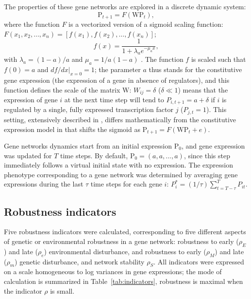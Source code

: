 \documentclass[10pt,a4paper]{article}
\newcommand{\stability}{{\rho_S}}
\newcommand{\earlyenv}{{\rho_E}}
\newcommand{\lateenv}{{\rho_e}}
\newcommand{\earlymut}{{\rho_M}}
\newcommand{\latemut}{{\rho_m}}
\newcommand{\W}{\bm{\mathrm W}}
\newcommand{\Pp}{\bm{\mathrm P}}
\begin{document}
The properties of these gene networks are explored in a discrete dynamic system:
\begin{equation}
 \Pp_{t+1} = F(\W \Pp_t),
\end{equation}
\noindent where the function $F$ is a vectorized version of a sigmoid scaling function: $F(x_1, x_2, \dots, x_n) = [f(x_1), f(x_2), \dots, f(x_n)]$;
\begin{equation} \label{eq:fx}
f(x) = \frac{1}{1+ \lambda_a e ^{- \mu_a x}}, 
\end{equation}
\noindent with $\lambda_a = (1-a)/a$ and $\mu_a = 1/a(1-a)$ \citep{GCL+18}. The function $f$ is scaled such that $f(0) = a$ and $df/dx|_{x=0}=1$; the parameter $a$ thus stands for the constitutive gene expression (the expression of a gene in absence of regulators), and this function defines the scale of the matrix $\W$: $W_{ij} = \delta$ ($\delta \ll 1$) means that the expression of gene $i$ at the next time step will tend to $P_{i,t+1} = a + \delta$ if $i$ is regulated by a single, fully expressed transcription factor $j$ ($P_{j,t} = 1$). This setting, extensively described in \citet{RL16}, differs mathematically from the constitutive expression model in \citet{Wag94} that shifts the sigmoid as $\Pp_{t+1} = F(\W \Pp_t + e)$.

Gene networks dynamics start from an initial expression $\Pp_0$, and gene expression was updated for $T$ time steps. By default, $\Pp_0 = (a, a, ..., a)$, since this step immediately follows a virtual initial state with no expression. The expression phenotype corresponding to a gene network was determined by averaging gene expressions during the last $\tau$ time steps for each gene $i$: $P_i^* = (1/\tau)\sum_{t=T-\tau}^T P_{it}$. 

\subsection{Robustness indicators}

Five robustness indicators were calculated, corresponding to five different aspects of genetic or environmental robustness in a gene network: robustness to early ($\earlyenv$) and late ($\lateenv$) environmental disturbance, and robustness to early ($\earlymut$) and late ($\latemut$) genetic disturbance, and network stability $\stability$. All indicators were expressed on a scale homogeneous to log variances in gene expressions; the mode of calculation is summarized in Table~\ref{tab:indicators}, robustness is maximal when the indicator $\rho$ is small. 
\end{document}
